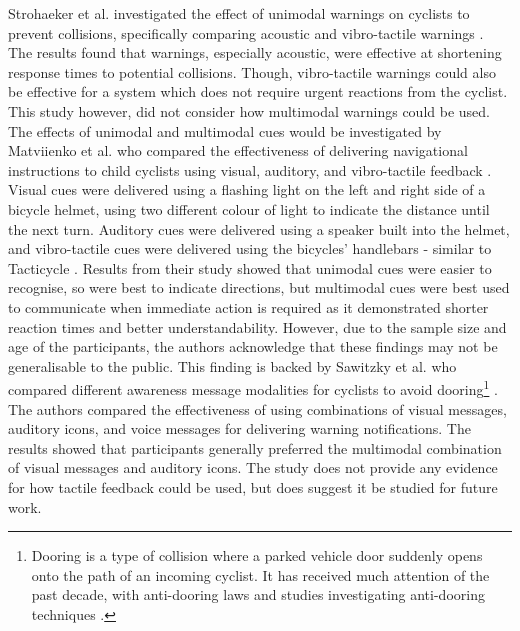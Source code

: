 \documentclass{interim}
\begin{document}
Strohaeker et al. investigated the effect of unimodal warnings on cyclists to prevent collisions, specifically comparing acoustic and vibro-tactile warnings \cite{STROHAEKER2022151}. The results found that warnings, especially acoustic, were effective at shortening response times to potential collisions. Though, vibro-tactile warnings could also be effective for a system which does not require urgent reactions from the cyclist. This study however, did not consider how multimodal warnings could be used. The effects of unimodal and multimodal cues would be investigated by Matviienko et al. who compared the effectiveness of delivering navigational instructions to child cyclists using visual, auditory, and vibro-tactile feedback \cite{10.1145/3290605.3300850, 10.1145/3229434.3229479}. 
Visual cues were delivered using a flashing light on the left and right side of a bicycle helmet, using two different colour of light to indicate the distance until the next turn. Auditory cues were delivered using a speaker built into the helmet, and vibro-tactile cues were delivered using the bicycles' handlebars - similar to Tacticycle \cite{10.1145/2371574.2371631}. Results from their study showed that unimodal cues were easier to recognise, so were best to indicate directions, but multimodal cues were best used to communicate when immediate action is required as it demonstrated shorter reaction times and better understandability. However, due to the sample size and age of the participants, the authors acknowledge that these findings may not be generalisable to the public. This finding is backed by Sawitzky et al. who compared different awareness message modalities for cyclists to avoid dooring\footnote{Dooring is a type of collision where a parked vehicle door suddenly opens onto the path of an incoming cyclist. It has received much attention of the past decade, with anti-dooring laws \cite{roadsafetyrules, highwaycode, illinoiscode} and studies investigating anti-dooring techniques \cite{large2018validating}.} \cite{10.1145/3490099.3511127, mti6010003}. The authors compared the effectiveness of using combinations of visual messages, auditory icons, and voice messages for delivering warning notifications. The results showed that participants generally preferred the multimodal combination of visual messages and auditory icons. The study does not provide any evidence for how tactile feedback could be used, but does suggest it be studied for future work.
\end{document}
